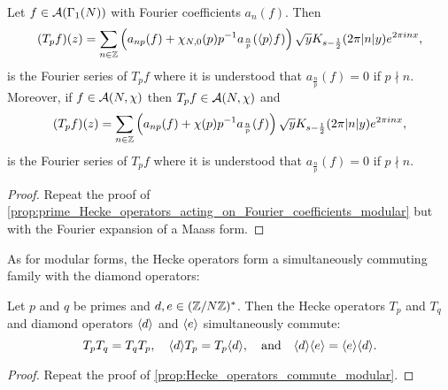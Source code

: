       \begin{proposition}\label{prop:prime_Hecke_operators_acting_on_Fourier_coefficients_Maass}
        Let $f \in \mathcal{A}(\Gamma_{1}(N))$ with Fourier coefficients $a_{n}(f)$. Then
        \[
          (T_{p}f)(z) = \sum_{n \in \mathbb{Z}}\left(a_{np}(f)+\chi_{N,0}(p)p^{-1}a_{\frac{n}{p}}(\langle p\rangle f)\right)\sqrt{y}K_{s-\frac{1}{2}}(2\pi|n|y)e^{2\pi inx},
        \]
        is the Fourier series of $T_{p}f$ where it is understood that $a_{\frac{n}{p}}(f) = 0$ if $p \nmid n$. Moreover, if $f \in \mathcal{A}(N,\chi)$ then $T_{p}f \in \mathcal{A}(N,\chi)$ and
        \[
          (T_{p}f)(z) = \sum_{n \in \mathbb{Z}}\left(a_{np}(f)+\chi(p)p^{-1}a_{\frac{n}{p}}(f)\right)\sqrt{y}K_{s-\frac{1}{2}}(2\pi|n|y)e^{2\pi inx},
        \]
        is the Fourier series of $T_{p}f$ where it is understood that $a_{\frac{n}{p}}(f) = 0$ if $p \nmid n$.
      \end{proposition}
      \begin{proof}
        Repeat the proof of \cref{prop:prime_Hecke_operators_acting_on_Fourier_coefficients_modular} but with the Fourier expansion of a Maass form.
      \end{proof}

      As for modular forms, the Hecke operators form a simultaneously commuting family with the diamond operators:

      \begin{proposition}\label{prop:Hecke_operators_commute_Maass}
        Let $p$ and $q$ be primes and $d,e \in (\mathbb{Z}/N\mathbb{Z})^{\ast}$. Then the Hecke operators $T_{p}$ and $T_{q}$ and diamond operators $\langle d\rangle$ and $\langle e\rangle$ simultaneously commute:
        \[
          T_{p}T_{q} = T_{q}T_{p}, \quad \langle d\rangle T_{p} = T_{p}\langle d\rangle, \quad \text{and} \quad \langle d\rangle\langle e\rangle = \langle e\rangle\langle d\rangle.
        \]
      \end{proposition}
      \begin{proof}
        Repeat the proof of \cref{prop:Hecke_operators_commute_modular}.
      \end{proof}

